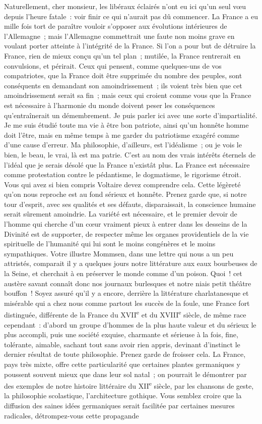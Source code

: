\documentclass[french,twoside]{book} %
\begin{document}
Naturellement, cher monsieur, les libéraux éclairés n’ont eu ici qu’un seul vœu depuis l’heure fatale : voir finir ce qui n’aurait pas dû commencer. La France a eu mille fois tort de paraître vouloir s’opposer aux évolutions intérieures de l’Allemagne ; mais l’Allemagne commettrait une faute non moins grave en voulant porter atteinte à l’intégrité de la France. Si l’on a pour but de détruire la France, rien de mieux conçu qu’un tel plan ; mutilée, la France rentrerait en convulsions, et périrait. Ceux qui pensent, comme quelques-uns de vos compatriotes, que la France doit être supprimée du nombre des peuples, sont conséquents en demandant son amoindrissement ; ils voient très bien que cet amoindrissement serait sa fin ; mais ceux qui croient comme vous que la France est nécessaire à l’harmonie du monde doivent peser les conséquences qu’entraînerait un démembrement. Je puis parler ici avec une sorte d’impartialité. Je me suis étudié toute ma vie à être bon patriote, ainsi qu’un honnête homme doit l’être, mais en même temps à me garder du patriotisme exagéré comme d’une cause d’erreur. Ma philosophie, d’ailleurs, est l’idéalisme ; ou je vois le bien, le beau, le vrai, là est ma patrie. C’est au nom des vrais intérêts éternels de l’idéal que je serais désolé que la France n’existât plus. La France est nécessaire comme protestation contre le pédantisme, le dogmatisme, le rigorisme étroit. Vous qui avez si bien compris Voltaire devez comprendre cela. Cette légèreté qu’on nous reproche est au fond sérieux et honnête. Prenez garde que, si notre tour d’esprit, avec ses qualités et ses défauts, disparaissait, la conscience humaine serait sûrement amoindrie. La variété est nécessaire, et le premier devoir de l’homme qui cherche d’un cœur vraiment pieux à entrer dans les desseins de la Divinité est de supporter, de respecter même les organes providentiels de la vie spirituelle de l’humanité qui lui sont le moins congénères et le moins sympathiques. Votre illustre Mommsen, dans une lettre qui nous a un peu attristés, comparait il y a quelques jours notre littérature aux eaux bourbeuses de la Seine, et cherchait à en préserver le monde comme d’un poison. Quoi ! cet austère savant connaît donc nos journaux burlesques et notre niais petit théâtre bouffon ! Soyez assuré qu’il y a encore, derrière la littérature charlatanesque et misérable qui a chez nous comme partout les succès de la foule, une France fort distinguée, différente de la France du XVII\textsuperscript{e} et du XVIII\textsuperscript{e} siècle, de même race cependant : d’abord un groupe d’hommes de la plus haute valeur et du sérieux le plus accompli, puis une société exquise, charmante et sérieuse à la fois, fine, tolérante, aimable, sachant tout sans avoir rien appris, devinant d’instinct le dernier résultat de toute philosophie. Prenez garde de froisser cela. La France, pays très mixte, offre cette particularité que certaines plantes germaniques y poussent souvent mieux que dans leur sol natal ; on pourrait le démontrer par des exemples de notre histoire littéraire du XII\textsuperscript{e} siècle, par les chansons de geste, la philosophie scolastique, l’architecture gothique. Vous semblez croire que la diffusion des saines idées germaniques serait facilitée par certaines mesures radicales, détrompez-vous cette propagande 
\end{document}
